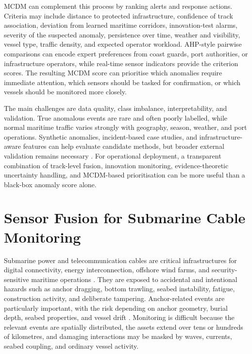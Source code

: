 \documentclass[11pt,oneside,openany]{book}
\begin{document}
MCDM can complement this process by ranking alerts and response actions. Criteria may include distance to protected infrastructure, confidence of track association, deviation from learned maritime corridors, innovation-test alarms, severity of the suspected anomaly, persistence over time, weather and visibility, vessel type, traffic density, and expected operator workload. AHP-style pairwise comparisons can encode expert preferences from coast guards, port authorities, or infrastructure operators, while real-time sensor indicators provide the criterion scores. The resulting MCDM score can prioritise which anomalies require immediate attention, which sensors should be tasked for confirmation, or which vessels should be monitored more closely.

The main challenges are data quality, class imbalance, interpretability, and validation. True anomalous events are rare and often poorly labelled, while normal maritime traffic varies strongly with geography, season, weather, and port operations. Synthetic anomalies, incident-based case studies, and infrastructure-aware features can help evaluate candidate methods, but broader external validation remains necessary \cite{oliva_tomei_prm_access_2026}. For operational deployment, a transparent combination of track-level fusion, innovation monitoring, evidence-theoretic uncertainty handling, and MCDM-based prioritisation can be more useful than a black-box anomaly score alone.

\section{Sensor Fusion for Submarine Cable Monitoring}

Submarine power and telecommunication cables are critical infrastructures for digital connectivity, energy interconnection, offshore wind farms, and security-sensitive maritime operations \cite{carter_submarine_2009,kavanagh_achieving_2025}. They are exposed to accidental and intentional hazards such as anchor dragging, bottom trawling, seabed instability, fatigue, construction activity, and deliberate tampering. Anchor-related events are particularly important, with the risk depending on anchor geometry, burial depth, seabed properties, and vessel drift \cite{yoon_safety_2013,osthoff_anchor_soil_2017,li_anchor_risk_2025}. Monitoring is difficult because the relevant events are spatially distributed, the assets extend over tens or hundreds of kilometres, and damaging interactions may be masked by waves, currents, seabed coupling, and ordinary vessel activity.
\end{document}
